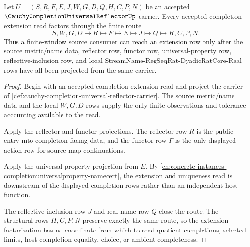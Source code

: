 \begin{theorem}
\label{thm:cauchy-completion-universal-reflector-extension-factorization}
Let $U=(S,R,F,E,J,W,G,D,Q,H,C,P,N)$ be an accepted $\CauchyCompletionUniversalReflectorUp$ carrier. Every accepted completion-extension read factors through the finite route
$$
S,W,G,D\longmapsto R\longmapsto F\longmapsto E\longmapsto J\longmapsto Q\longmapsto H,C,P,N .
$$
Thus a finite-window source consumer can reach an extension row only after the source metric/name data, reflector row, functor row, universal-property row, reflective-inclusion row, and local StreamName-RegSeqRat-DyadicRatCore-Real rows have all been projected from the same carrier.
\end{theorem}
\begin{proof}
Begin with an accepted completion-extension read and project the carrier of \autoref{def:cauchy-completion-universal-reflector-carrier}. The source metric/name data and the local $W,G,D$ rows supply the only finite observations and tolerance accounting available to the read.

Apply the reflector and functor projections. The reflector row $R$ is the public entry into completion-facing data, and the functor row $F$ is the only displayed action row for source-map continuations.

Apply the universal-property projection from $E$. By \autoref{ch:concrete-instances-completionuniversalproperty-namecert}, the extension and uniqueness read is downstream of the displayed completion rows rather than an independent host function.

The reflective-inclusion row $J$ and real-name row $Q$ close the route. The structural rows $H,C,P,N$ preserve exactly the same route, so the extension factorization has no coordinate from which to read quotient completions, selected limits, host completion equality, choice, or ambient completeness.
\end{proof}

